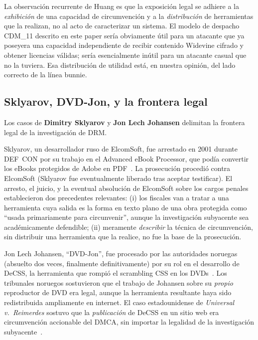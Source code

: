 \documentclass[11pt,letterpaper]{article}
\begin{document}
La observación recurrente de Huang es que la exposición legal se
adhiere a la \emph{exhibición} de una capacidad de circumvención
y a la \emph{distribución} de herramientas que la realizan, no al
acto de caracterizar un sistema. El modelo de despacho CDM\_11
descrito en este paper sería obviamente útil para un atacante que
ya poseyera una capacidad independiente de recibir contenido
Widevine cifrado y obtener licencias válidas; sería esencialmente
inútil para un atacante casual que no la tuviera. Esa distribución
de utilidad está, en nuestra opinión, del lado correcto de la
línea bunnie.

\subsection{Sklyarov, DVD-Jon, y la frontera legal}
\label{sec:ante-legal}

Los casos de \textbf{Dimitry Sklyarov} y \textbf{Jon Lech
Johansen} delimitan la frontera legal de la investigación de DRM.

Sklyarov, un desarrollador ruso de ElcomSoft, fue arrestado en
2001 durante DEF~CON por su trabajo en el Advanced eBook
Processor, que podía convertir los eBooks protegidos de Adobe en
PDF~\cite{sklyarov-case}. La prosecución procedió contra
ElcomSoft (Sklyarov fue eventualmente liberado tras aceptar
testificar). El arresto, el juicio, y la eventual absolución de
ElcomSoft sobre los cargos penales establecieron dos precedentes
relevantes: (i) los fiscales van a tratar a una herramienta cuya
salida es la forma en texto plano de una obra protegida como
``usada primariamente para circunvenir'', aunque la investigación
subyacente sea académicamente defendible; (ii) meramente
\emph{describir} la técnica de circumvención, sin distribuir una
herramienta que la realice, no fue la base de la prosecución.

Jon Lech Johansen, ``DVD-Jon'', fue procesado por las autoridades
noruegas (absuelto dos veces, finalmente definitivamente) por su
rol en el desarrollo de DeCSS, la herramienta que rompió el
scrambling CSS en los DVDs~\cite{dvdjon-norway}. Los tribunales
noruegos sostuvieron que el trabajo de Johansen sobre su
\emph{propio} reproductor de DVD era legal, aunque la herramienta
resultante haya sido redistribuida ampliamente en internet. El
caso estadounidense de \emph{Universal v.~Reimerdes} sostuvo que
la \emph{publicación} de DeCSS en un sitio web era circumvención
accionable del DMCA, sin importar la legalidad de la
investigación subyacente~\cite{decss-2600}.
\end{document}
